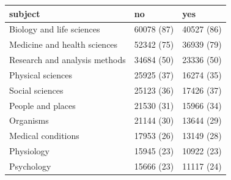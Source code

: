 \begin{table}[ht]
\centering
\begin{tabular}{lll}
 subject & no & yes \\ 
  \hline
Biology and life sciences & 60078 (87) & 40527 (86) \\ 
  Medicine and health sciences & 52342 (75) & 36939 (79) \\ 
  Research and analysis methods & 34684 (50) & 23336 (50) \\ 
  Physical sciences & 25925 (37) & 16274 (35) \\ 
  Social sciences & 25123 (36) & 17426 (37) \\ 
  People and places & 21530 (31) & 15966 (34) \\ 
  Organisms & 21144 (30) & 13644 (29) \\ 
  Medical conditions & 17953 (26) & 13149 (28) \\ 
  Physiology & 15945 (23) & 10922 (23) \\ 
  Psychology & 15666 (23) & 11117 (24) \\ 
  \end{tabular}
\end{table}
